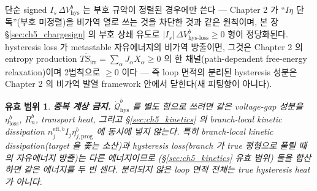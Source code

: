 \documentclass[11pt,a4paper]{article}
\newtheorem*{boundbox}{유효 범위}
\newcommand{\eff}{\mathrm{eff}}
\newcommand{\irr}{\mathrm{irr}}
\newcommand{\hys}{\mathrm{hys}}
\newcommand{\loss}{\mathrm{loss}}
\newcommand{\prog}{\mathrm{prog}}
\begin{document}
단순 signed $I_s\,\Delta V_\hys^b$ 는 부호 규약이 정렬된 경우에만 쓴다 — Chapter 2 가 ``$I\eta$ 단독''(부호
미정렬)을 비가역 열로 쓰는 것을 차단한 것과 같은 원칙이며, 본 장 \S\ref{sec:ch5_chargesign} 의 부호 상쇄 유도로
$|I_s|\,\Delta V_{\hys\text{-}\loss}^b\ge0$ 형이 정당화된다. hysteresis loss 가 metastable 자유에너지의 비가역
방출이면, 그것은 Chapter 2 의 entropy production $T\dot S_\irr=\sum_\alpha J_\alpha X_\alpha\ge0$ 의 한
채널(path-dependent free-energy relaxation)이며 2법칙으로 $\ge0$ 이다 — 즉 loop 면적의 분리된 hysteresis 성분은
Chapter 2 의 비가역 발열 framework 안에서 닫힌다(새 피팅항이 아니다).

\begin{boundbox}
\textbf{중복 계상 금지.} $\dot{\mathcal Q}_{\hys}^b$ 를 별도 항으로 쓰려면 같은 voltage-gap 성분을 $\eta_\loss^b$,
$R_n^b$, transport heat, 그리고 \S\ref{sec:ch5_kinetics} 의 branch-local kinetic dissipation
$n_j^{\eff,b}I_j\eta_{j,\prog}^b$ 에 \emph{동시에} 넣지 않는다. 특히 branch-local kinetic dissipation(target 을
좇는 소산)과 hysteresis loss(branch 가 true 평형으로 풀릴 때의 자유에너지 방출)는 다른 에너지이므로
(\S\ref{sec:ch5_kinetics} 유효 범위) 둘을 합산하면 같은 에너지를 두 번 센다. 분리되지 않은 loop 면적 전체는
true hysteresis heat 가 아니다.
\end{boundbox}

\end{document}
